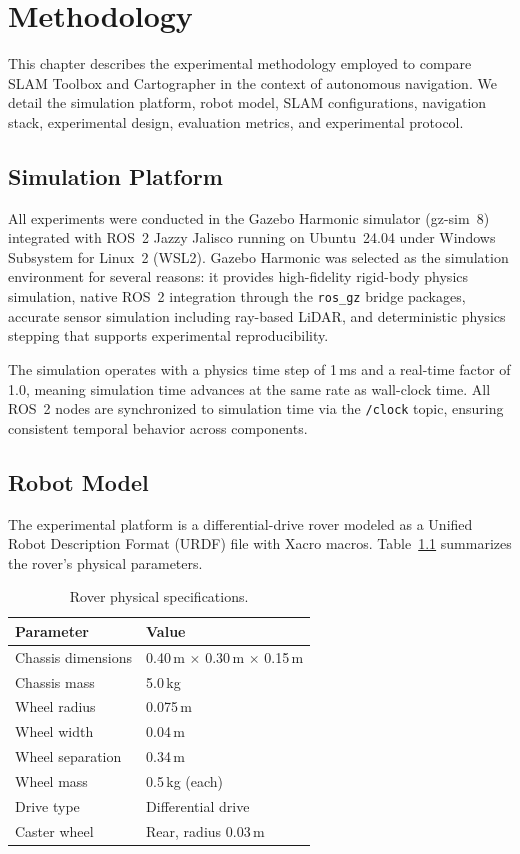 \chapter{Methodology}
\label{ch:methodology}

This chapter describes the experimental methodology employed to compare SLAM Toolbox and Cartographer in the context of autonomous navigation. We detail the simulation platform, robot model, SLAM configurations, navigation stack, experimental design, evaluation metrics, and experimental protocol.

\section{Simulation Platform}

All experiments were conducted in the Gazebo Harmonic simulator (gz-sim~8) integrated with ROS~2 Jazzy Jalisco running on Ubuntu~24.04 under Windows Subsystem for Linux~2 (WSL2). Gazebo Harmonic was selected as the simulation environment for several reasons: it provides high-fidelity rigid-body physics simulation, native ROS~2 integration through the \texttt{ros\_gz} bridge packages, accurate sensor simulation including ray-based LiDAR, and deterministic physics stepping that supports experimental reproducibility.

The simulation operates with a physics time step of 1\,ms and a real-time factor of 1.0, meaning simulation time advances at the same rate as wall-clock time. All ROS~2 nodes are synchronized to simulation time via the \texttt{/clock} topic, ensuring consistent temporal behavior across components.

\section{Robot Model}

The experimental platform is a differential-drive rover modeled as a Unified Robot Description Format (URDF) file with Xacro macros. Table~\ref{tab:robot_specs} summarizes the rover's physical parameters.

\begin{table}[htbp]
\centering
\caption{Rover physical specifications.}
\label{tab:robot_specs}
\begin{tabular}{ll}
\toprule
\textbf{Parameter} & \textbf{Value} \\
\midrule
Chassis dimensions & 0.40\,m $\times$ 0.30\,m $\times$ 0.15\,m \\
Chassis mass & 5.0\,kg \\
Wheel radius & 0.075\,m \\
Wheel width & 0.04\,m \\
Wheel separation & 0.34\,m \\
Wheel mass & 0.5\,kg (each) \\
Drive type & Differential drive \\
Caster wheel & Rear, radius 0.03\,m \\
\bottomrule
\end{tabular}
\end{table}

